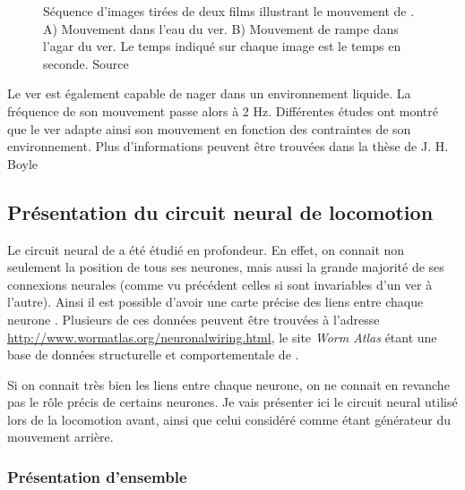 \begin{figure}[ht]
   \begin{center}
   \end{center}
   \caption[Séquence d'image du mouvement de \celeg{}]{Séquence d'images tirées de deux films illustrant le mouvement de
   \celeg{}. A) Mouvement dans l'eau du ver. B) Mouvement de rampe dans l'agar du ver. Le
   temps indiqué sur chaque image est le temps en seconde. Source \boylecite{}}
   \label{fig:celegans_mouvement}
\end{figure}

Le ver est également capable de nager dans un environnement liquide. La fréquence
de son mouvement passe alors à 2 Hz. Différentes études ont montré que le ver
adapte ainsi son mouvement en fonction des contraintes de son environnement.
Plus d'informations peuvent être trouvées dans la thèse de J. H. Boyle \cite{Boyle2009}


\subsection{Présentation du circuit neural de locomotion} %
\label{sub:Présentation du circuit neural de locomotion}

Le circuit neural de \celeg{} a été étudié en profondeur. En effet, on connait
non seulement la position de tous ses neurones, mais aussi la grande majorité
de ses connexions neurales (comme vu précédent celles si sont invariables d'un
ver à l'autre).  Ainsi il est possible d'avoir une carte précise des liens
entre chaque neurone \cite{Durbin1987,Chen2006,Boyle2009,Varshney2011}.
Plusieurs de ces données peuvent être trouvées à l'adresse
\url{http://www.wormatlas.org/neuronalwiring.html}, le site \textit{Worm Atlas}
étant une base de données structurelle et comportementale de \celeg{}.

Si on connait très bien les liens entre chaque neurone, on ne connait en
revanche pas le rôle précis de certains neurones. Je vais présenter ici le
circuit neural utilisé lors de la locomotion avant, ainsi que celui
considéré comme étant générateur du mouvement arrière.

\subsubsection{Présentation d'ensemble} %
\label{ssub:Présentation d'ensemble}

